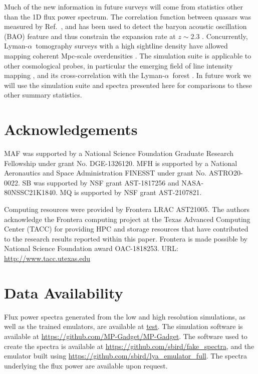 \documentclass[a4paper,11pt]{article}
\newcommand{\Lya}{Lyman-$\alpha$}
\begin{document}
Much of the new information in future surveys will come from statistics other than the 1D flux power spectrum. The correlation function between quasars was measured by Ref.~\cite{Slosar:2011}, and has been used to detect the baryon acoustic oscillation (BAO) feature and thus constrain the expansion rate at $z\sim 2.3$ \cite{dSAgathe:2019, Cuceu:2022}. Concurrently, \Lya~tomography surveys with a high sightline density have allowed mapping coherent Mpc-scale overdensities \cite{Lee:CLAMATO, LATIS, Qezlou:2022, Horowitz:2022}. The simulation suite is applicable to other cosmological probes, in particular the emerging field of line intensity mapping \cite{Kovetz:2017}, and its cross-correlation with the \Lya~forest \cite{Qezlou:2023}. In future work we will use the simulation suite and spectra presented here for comparisons to these other summary statistics.

\section*{Acknowledgements}
MAF was supported by a National Science Foundation Graduate Research Fellowship under grant No. DGE-1326120. MFH is supported by a National Aeronautics and Space Administration FINESST under grant No. ASTRO20-0022. SB was supported by NSF grant AST-1817256 and NASA-80NSSC21K1840. MQ is supported by NSF grant AST-2107821.

Computing resources were provided by Frontera LRAC AST21005.
The authors acknowledge the Frontera computing project at the Texas Advanced Computing Center (TACC) for providing HPC and storage resources that have contributed to the research results reported within this paper.
Frontera is made possible by National Science Foundation award OAC-1818253.
URL: \url{http://www.tacc.utexas.edu}

\section*{Data Availability}

Flux power spectra generated from the low and high resolution simulations, as well as the trained emulators, are available at \url{test}. The simulation software is available at \url{https://github.com/MP-Gadget/MP-Gadget}. The software used to create the spectra is available at \url{https://github.com/sbird/fake_spectra}, and the emulator built using \url{https://github.com/sbird/lya_emulator_full}. The spectra underlying the flux power are available upon request.




\appendix

\label{lastpage}
\end{document}
